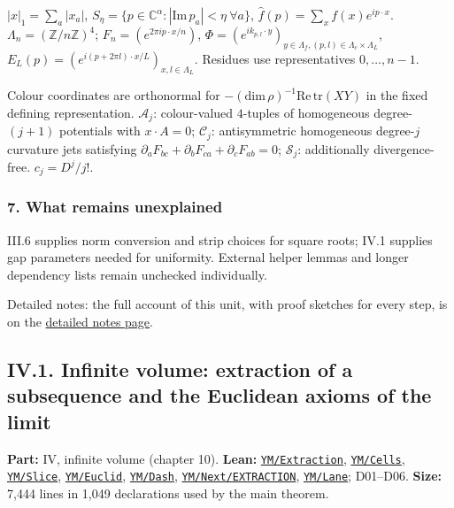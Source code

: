 \documentclass[
  letterpaper,
  11pt]{article}
\begin{document}
\(|x|_1=\sum_a|x_a|\),
\(S_\eta=\{p\in\mathbb C^\alpha:|\mathrm{Im}\,p_a|<\eta\ \forall a\}\),
\(\hat f(p)=\sum_xf(x)e^{ip\cdot x}\).
\(\Lambda_n=(\mathbb Z/n\mathbb Z)^4\); \(F_n=(e^{2\pi ip\cdot x/n})\),
\(\Phi=(e^{ik_{p,l}\cdot y})_{y\in\Lambda_f,(p,l)\in\Lambda_c\times\Lambda_L}\),
\(E_L(p)=(e^{i(p+2\pi l)\cdot x/L})_{x,l\in\Lambda_L}\). Residues use
representatives \(0,\ldots,n-1\).

Colour coordinates are orthonormal for
\(-(\mathrm{dim}\,\rho)^{-1}\mathrm{Re}\,\mathrm{tr}(XY)\) in the fixed
defining representation. \(\mathcal A_j\): colour-valued \(4\)-tuples of
homogeneous degree-\((j+1)\) potentials with \(x\cdot A=0\);
\(\mathcal C_j\): antisymmetric homogeneous degree-\(j\) curvature jets
satisfying \(\partial_aF_{bc}+\partial_bF_{ca}+\partial_cF_{ab}=0\);
\(\mathcal S_j\): additionally divergence-free. \(c_j=D^j/j!\).

\subsubsection{7. What remains
unexplained}\label{what-remains-unexplained-18}

III.6 supplies norm conversion and strip choices for square roots; IV.1
supplies gap parameters needed for uniformity. External helper lemmas
and longer dependency lists remain unchecked individually.

Detailed notes: the full account of this unit, with proof sketches for
every step, is on the
\href{https://github.com/scottnarmstrong/yang-mills-informalization/blob/main/outline/notes/III-16.md}{detailed
notes page}.

\subsection{IV.1. Infinite volume: extraction of a subsequence and the
Euclidean axioms of the
limit}\label{iv.1.-infinite-volume-extraction-of-a-subsequence-and-the-euclidean-axioms-of-the-limit}

\textbf{Part:} IV, infinite volume (chapter 10). \textbf{Lean:}
\href{https://github.com/yang-mills-group/OpenAI-YM-20261028/tree/3456e5e75cf8d4cd558955a5c7638fba2d68f464/YM/Extraction}{\texttt{YM/Extraction}},
\href{https://github.com/yang-mills-group/OpenAI-YM-20261028/tree/3456e5e75cf8d4cd558955a5c7638fba2d68f464/YM/Cells}{\texttt{YM/Cells}},
\href{https://github.com/yang-mills-group/OpenAI-YM-20261028/tree/3456e5e75cf8d4cd558955a5c7638fba2d68f464/YM/Slice}{\texttt{YM/Slice}},
\href{https://github.com/yang-mills-group/OpenAI-YM-20261028/tree/3456e5e75cf8d4cd558955a5c7638fba2d68f464/YM/Euclid}{\texttt{YM/Euclid}},
\href{https://github.com/yang-mills-group/OpenAI-YM-20261028/tree/3456e5e75cf8d4cd558955a5c7638fba2d68f464/YM/Dash}{\texttt{YM/Dash}},
\href{https://github.com/yang-mills-group/OpenAI-YM-20261028/tree/3456e5e75cf8d4cd558955a5c7638fba2d68f464/YM/Next/EXTRACTION}{\texttt{YM/Next/EXTRACTION}},
\href{https://github.com/yang-mills-group/OpenAI-YM-20261028/tree/3456e5e75cf8d4cd558955a5c7638fba2d68f464/YM/Lane}{\texttt{YM/Lane}};
D01--D06. \textbf{Size:} 7,444 lines in 1,049 declarations used by the
main theorem.
\end{document}
